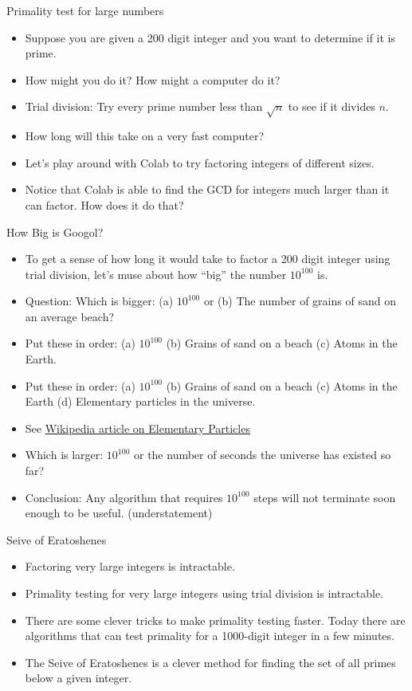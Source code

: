 \documentclass[handout]{beamer}
\begin{document}
\begin{frame}{Primality test for large numbers}
\begin{itemize}
  \item Suppose you are given a 200 digit integer  and you want to determine if it is prime.
  \item How might you do it? How might a computer do it?
  \item Trial division: Try every prime number less than $\sqrt{n}$ to see if it divides $n$.
  \item How long will this take on a very fast computer?
  \item Let's play around with Colab to try factoring integers of different sizes.
  \item Notice that Colab is able to find the GCD for integers much larger than it can factor.
  How does it do that?
\end{itemize}
\end{frame}

\begin{frame}{How Big is Googol?}
\begin{itemize}
  \item To get a sense of how long it would take to factor a 200 digit integer using trial division,
  let's muse about how ``big'' the number $10^{100}$ is.
  \item Question: Which is bigger: (a) $10^{100}$ or (b) The number of grains of sand on an average beach?
  \item Put these in order: (a) $10^{100}$ (b) Grains of sand on a beach
  (c) Atoms in the Earth.
  \item Put these in order: (a) $10^{100}$ (b) Grains of sand on a beach
  (c) Atoms in the Earth (d) Elementary particles in the universe.
  \item See \href{https://en.wikipedia.org/wiki/Elementary_particle\#Cosmic_abundance_of_elementary_particles}{Wikipedia article on Elementary Particles}
  \item Which is larger: $10^{100}$ or the number of seconds the universe has existed so far?
  \item Conclusion: Any algorithm that requires $10^{100}$ steps will not terminate soon enough to be useful. (understatement)
\end{itemize}
\end{frame}

\begin{frame}{Seive of Eratoshenes}
\begin{itemize}
  \item Factoring very large integers is intractable.
  \item Primality testing for very large integers using trial division is intractable.
  \item There are some clever tricks to make primality testing faster. Today there are
  algorithms that can test primality for a 1000-digit integer in a few minutes.
  \item The Seive of Eratoshenes is a clever method for finding the set of all
  primes below a given integer.
\end{itemize}
\end{frame}
\end{document}

